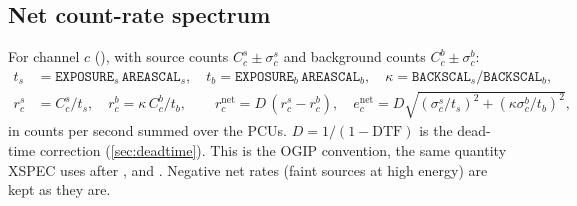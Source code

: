 \subsection{Net count-rate spectrum}\label{sec:net}
For channel $c$ (), with source counts $C^s_c\pm\sigma^s_c$ and background counts
$C^b_c\pm\sigma^b_c$:
\begin{align}
t_s &= \mathtt{EXPOSURE}_s\,\mathtt{AREASCAL}_s,\quad t_b = \mathtt{EXPOSURE}_b\,\mathtt{AREASCAL}_b,\quad
\kappa=\mathtt{BACKSCAL}_s/\mathtt{BACKSCAL}_b,\nonumber\\
r^s_c &= C^s_c/t_s,\quad r^b_c=\kappa\,C^b_c/t_b,\qquad
r^\mathrm{net}_c = D\,(r^s_c-r^b_c),\quad e^\mathrm{net}_c = D\sqrt{(\sigma^s_c/t_s)^2+(\kappa\sigma^b_c/t_b)^2},\label{eq:net}
\end{align}
in counts per second summed over the PCUs. $D=1/(1-\mathrm{DTF})$ is the dead-time correction (\cref{sec:deadtime}). This is the
OGIP convention, the same quantity XSPEC uses after ,  and . Negative net rates
(faint sources at high energy) are kept as they are.

